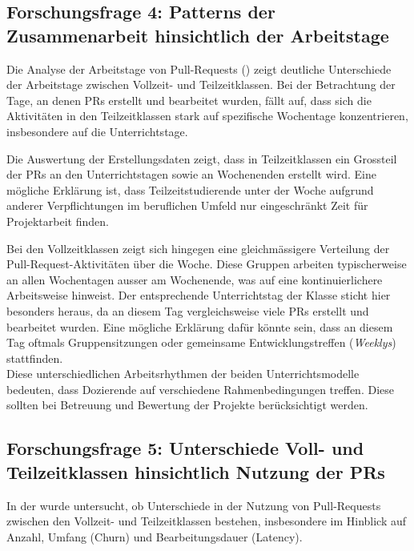 \subsection{Forschungsfrage 4: Patterns der Zusammenarbeit hinsichtlich der Arbeitstage}
Die Analyse der Arbeitstage von Pull-Requests () zeigt deutliche Unterschiede der Arbeitstage zwischen Vollzeit- und Teilzeitklassen. Bei der Betrachtung der Tage, an denen PRs erstellt und bearbeitet wurden, fällt auf, dass sich die Aktivitäten in den Teilzeitklassen stark auf spezifische Wochentage konzentrieren, insbesondere auf die Unterrichtstage. 

Die Auswertung der Erstellungsdaten zeigt, dass in Teilzeitklassen ein Grossteil der PRs an den Unterrichtstagen sowie an Wochenenden erstellt wird. Eine mögliche Erklärung ist, dass Teilzeitstudierende unter der Woche aufgrund anderer Verpflichtungen im beruflichen Umfeld nur eingeschränkt Zeit für Projektarbeit finden.

Bei den Vollzeitklassen zeigt sich hingegen eine gleichmässigere Verteilung der Pull-Request-Aktivitäten über die Woche. Diese Gruppen arbeiten typischerweise an allen Wochentagen ausser am Wochenende, was auf eine kontinuierlichere Arbeitsweise hinweist. Der entsprechende Unterrichtstag der Klasse sticht hier besonders heraus, da an diesem Tag vergleichsweise viele PRs erstellt und bearbeitet wurden. Eine mögliche Erklärung dafür könnte sein, dass an diesem Tag oftmals Gruppensitzungen oder gemeinsame Entwicklungstreffen (\textit{Weeklys}) stattfinden. \\
Diese unterschiedlichen Arbeitsrhythmen der beiden Unterrichtsmodelle bedeuten, dass Dozierende auf verschiedene Rahmenbedingungen treffen. Diese sollten bei Betreuung und Bewertung der Projekte berücksichtigt werden.

\subsection{Forschungsfrage 5: Unterschiede Voll- und Teilzeitklassen hinsichtlich Nutzung der PRs}
In der  wurde untersucht, ob Unterschiede in der Nutzung von Pull-Requests zwischen den Vollzeit- und Teilzeitklassen bestehen, insbesondere im Hinblick auf Anzahl, Umfang (Churn) und Bearbeitungsdauer (Latency).

